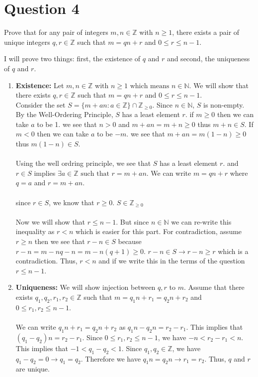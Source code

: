 \documentclass{article}
\begin{document}
\section{Question 4}
Prove that for any pair of integers $m, n \in \mathbb{Z}$ with $n \geq 1$, there exists a pair of unique integers $q, r \in \mathbb{Z}$ such that $m = qn + r$ and $0 \leq r \leq n -1$.
\begin{proofbox}
    I will prove two things: first, the existence of $q$ and $r$ and second, the uniqueness of $q$ and $r$.
    \begin{enumerate}
        \item \textbf{Existence:} Let $m, n \in \mathbb{Z}$ with $n \geq 1 \text{ which means } n \in \mathbb{N}$. We will show that there exists $q, r \in \mathbb{Z}$ such that $m = qn + r$ and $0 \leq r \leq n - 1$.
        \\ Consider the set $S = \{m + an: a \in \mathbb{Z}\} \cap \mathbb{Z}_{\geq 0}$. Since $n \in \mathbb{N}$, $S$ is non-empty. By the Well-Ordering Principle, $S$ has a least element $r$. if $m \geq 0$ then we can take $a$ to be 1. we see that $n>0$ and $m + an = m+n \geq 0$ thus $m+n \in S$. If $m < 0$ then we can take $a$ to be $-m$. we see that $m + an = m (1-n) \geq 0$ thus $m(1-n) \in S$. \\ 
        \\ Using the well ordring principle, we see that $S$ has a least element $r$. and $r \in S$ implies $\exists a \in \mathbb{Z} \text{ such that } r = m + an$. We can write $m = qn + r$ where $q = a$ and $r = m + an$.
        \\ \\ since $r \in S$, we know that $r \geq 0$. $S \in \mathbb{Z}_{\geq 0}$ \\ \\ 
        Now we will show that $r \leq n - 1$. But since $n \in \mathbb{N}$ we can re-write this inequality as $r < n$ which is easier for this part. For contradiction, assume $r \geq n$ then we see that $r - n \in S$ because $r - n = m - nq - n = m - n(q + 1) \geq 0$. $r- n \in S \rightarrow r - n \geq r$ which is a contradiction. Thus, $r < n$ and if we write this in the terms of the question $r \leq n -1$.


        \item \textbf{Uniqueness:} We will show injection between $q, r$ to $m$. Assume that there exists $q_1, q_2, r_1, r_2 \in \mathbb{Z}$ such that $m = q_1n + r_1 = q_2n + r_2$ and $0 \leq r_1, r_2 \leq n - 1$.
        \\ \\ 
        We can write $q_1n + r_1 = q_2n + r_2$ as $q_1n - q_2n = r_2 - r_1$. This implies that $(q_1 - q_2)n = r_2 - r_1$. Since $0 \leq r_1, r_2 \leq n - 1$, we have $-n < r_2 - r_1 < n$. This implies that $-1 < q_1 - q_2 < 1$. Since $q_1, q_2 \in \mathbb{Z}$, we have $q_1 - q_2 = 0 \rightarrow q_1 = q_2$. Therefore we have $q_1 n = q_2 n \rightarrow r_1 = r_2$. Thus, $q$ and $r$ are unique.


\end{enumerate}
\end{proofbox}
\end{document}
